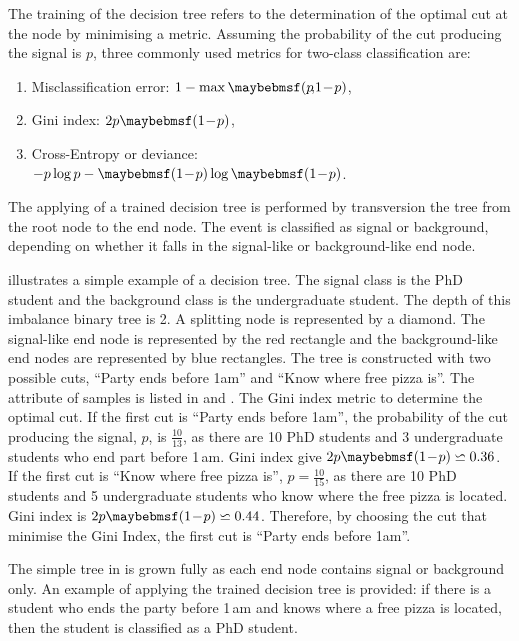 The training of the decision tree refers to the determination of  the optimal cut at the node by minimising a metric. Assuming the probability of the cut producing the signal is $p$, three commonly used metrics for two-class classification are:
\begin{enumerate}
\item Misclassification error:  $1 - \max\parenths{p\!,\!1\!-\!p}$,
\item Gini index: $2p\parenths{1\!-\!p}$,
\item Cross-Entropy or deviance: $-p\log{p}-\parenths{1\!-\!p}\log\parenths{1\!-\!p}$.
\end{enumerate}

The applying of a trained decision tree is performed by transversion the tree from the root node to the end node. The event is classified as signal or background, depending on whether it falls in the signal-like or background-like end node.



 illustrates a simple example of a decision tree. The signal class is the PhD student and the background class is the undergraduate student. The depth of this imbalance binary  tree is 2. A splitting node is represented by a diamond.  The signal-like end node is represented by the red rectangle and the background-like end nodes are represented by blue rectangles. The tree is constructed with two possible cuts, ``Party ends before 1am'' and ``Know where free pizza is''. The attribute of samples is listed in  and  . The Gini index metric to determine the optimal cut. If the first cut is ``Party ends before 1am'', the probability of the cut producing the signal, $p$, is $\frac{10}{13}$, as there are 10 PhD students and 3 undergraduate students who end part before 1\,am. Gini index give $2p\parenths{1\!-\!p} \backsimeq 0.36 $. If the first cut is ``Know where free pizza is'', $p=\frac{10}{15}$, as there are  10 PhD students and 5 undergraduate students who know where the free pizza is located. Gini index is $2p\parenths{1\!-\!p} \backsimeq 0.44 $. Therefore, by choosing the cut that minimise the Gini Index, the first cut is ``Party ends before 1am''.

The simple tree in  is grown fully as each end node contains signal or background only. An example of applying the trained decision tree is provided: if there is a student who ends the party before 1\,am and knows where a free pizza is located, then the student is classified as a PhD student.

